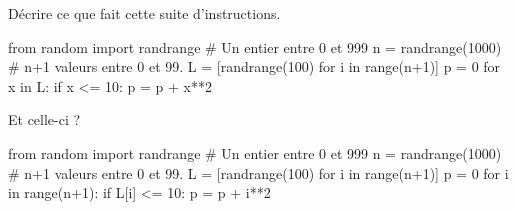 Décrire ce que fait cette suite d'instructions. 
\begin{pyverbatim}
from random import randrange
# Un entier entre 0 et 999
n = randrange(1000) 
# n+1 valeurs entre 0 et 99.
L = [randrange(100) for i in range(n+1)] 
p = 0
for x in L:
    if x <= 10:
        p = p + x**2
\end{pyverbatim}
Et celle-ci ? 
\begin{pyverbatim}
from random import randrange
# Un entier entre 0 et 999
n = randrange(1000) 
# n+1 valeurs entre 0 et 99.
L = [randrange(100) for i in range(n+1)] 
p = 0
for i in range(n+1):
    if L[i] <= 10:
        p = p + i**2
\end{pyverbatim}
